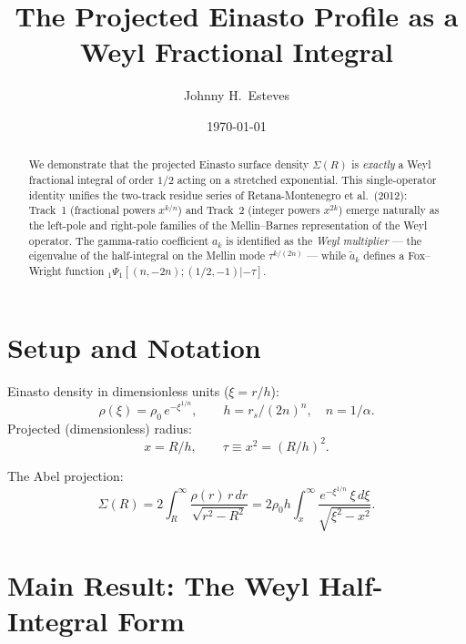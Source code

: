 \documentclass{article}
\title{The Projected Einasto Profile as a Weyl Fractional Integral}
\author{Johnny H.~Esteves}
\date{\today}
\begin{document}
\maketitle

\begin{abstract}
We demonstrate that the projected Einasto surface density $\Sigma(R)$ is
\emph{exactly} a Weyl fractional integral of order $1/2$ acting on a stretched
exponential. This single-operator identity unifies the two-track residue series
of Retana-Montenegro et al.\ (2012): Track~1 (fractional powers $x^{k/n}$) and
Track~2 (integer powers $x^{2k}$) emerge naturally as the left-pole and
right-pole families of the Mellin--Barnes representation of the Weyl operator.
The gamma-ratio coefficient $a_k$ is identified as the \emph{Weyl multiplier}
--- the eigenvalue of the half-integral on the Mellin mode $\tau^{k/(2n)}$ ---
while $\tilde{a}_k$ defines a Fox--Wright function
${}_1\Psi_1[(n,-2n);(1/2,-1)|{-}\tau]$.
\end{abstract}

\section{Setup and Notation}

Einasto density in dimensionless units ($\xi = r/h$):
\begin{equation}\label{eq:rho}
\rho(\xi) = \rho_0\,e^{-\xi^{1/n}},\qquad
h = r_s/(2n)^n,\quad n = 1/\alpha.
\end{equation}
Projected (dimensionless) radius:
\begin{equation}
x = R/h,\qquad \tau \equiv x^2 = (R/h)^2.
\end{equation}

The Abel projection:
\begin{equation}\label{eq:abel}
\Sigma(R) = 2\int_R^\infty \frac{\rho(r)\,r\,dr}{\sqrt{r^2-R^2}}
= 2\rho_0 h\int_x^\infty \frac{e^{-\xi^{1/n}}\,\xi\,d\xi}{\sqrt{\xi^2-x^2}}.
\end{equation}

\section{Main Result: The Weyl Half-Integral Form}
\label{sec:main}
\end{document}
